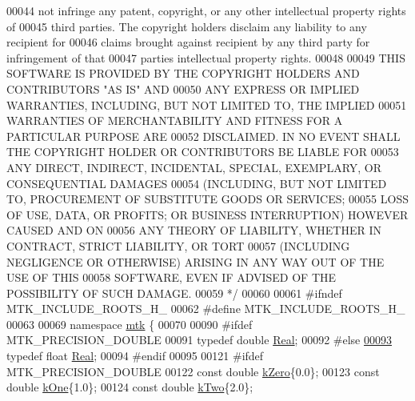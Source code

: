 \begin{DoxyCode}
00044 \textcolor{comment}{not infringe any patent, copyright, or any other intellectual property rights of}
00045 \textcolor{comment}{third parties. The copyright holders disclaim any liability to any recipient for}
00046 \textcolor{comment}{claims brought against recipient by any third party for infringement of that}
00047 \textcolor{comment}{parties intellectual property rights.}
00048 \textcolor{comment}{}
00049 \textcolor{comment}{THIS SOFTWARE IS PROVIDED BY THE COPYRIGHT HOLDERS AND CONTRIBUTORS "AS IS" AND}
00050 \textcolor{comment}{ANY EXPRESS OR IMPLIED WARRANTIES, INCLUDING, BUT NOT LIMITED TO, THE IMPLIED}
00051 \textcolor{comment}{WARRANTIES OF MERCHANTABILITY AND FITNESS FOR A PARTICULAR PURPOSE ARE}
00052 \textcolor{comment}{DISCLAIMED. IN NO EVENT SHALL THE COPYRIGHT HOLDER OR CONTRIBUTORS BE LIABLE FOR}
00053 \textcolor{comment}{ANY DIRECT, INDIRECT, INCIDENTAL, SPECIAL, EXEMPLARY, OR CONSEQUENTIAL DAMAGES}
00054 \textcolor{comment}{(INCLUDING, BUT NOT LIMITED TO, PROCUREMENT OF SUBSTITUTE GOODS OR SERVICES;}
00055 \textcolor{comment}{LOSS OF USE, DATA, OR PROFITS; OR BUSINESS INTERRUPTION) HOWEVER CAUSED AND ON}
00056 \textcolor{comment}{ANY THEORY OF LIABILITY, WHETHER IN CONTRACT, STRICT LIABILITY, OR TORT}
00057 \textcolor{comment}{(INCLUDING NEGLIGENCE OR OTHERWISE) ARISING IN ANY WAY OUT OF THE USE OF THIS}
00058 \textcolor{comment}{SOFTWARE, EVEN IF ADVISED OF THE POSSIBILITY OF SUCH DAMAGE.}
00059 \textcolor{comment}{*/}
00060 
00061 \textcolor{preprocessor}{#ifndef MTK\_INCLUDE\_ROOTS\_H\_}
00062 \textcolor{preprocessor}{#define MTK\_INCLUDE\_ROOTS\_H\_}
00063 
00069 \textcolor{keyword}{namespace }\hyperlink{namespacemtk}{mtk} \{
00070 
00090 \textcolor{preprocessor}{#ifdef MTK\_PRECISION\_DOUBLE}
00091 \textcolor{keyword}{typedef} \textcolor{keywordtype}{double} \hyperlink{group__c01-roots_gac080bbbf5cbb5502c9f00405f894857d}{Real};
00092 \textcolor{preprocessor}{#else}
\hypertarget{mtk__roots_8h_source_l00093}{}\hyperlink{group__c01-roots_gac080bbbf5cbb5502c9f00405f894857d}{00093} \textcolor{keyword}{typedef} \textcolor{keywordtype}{float} \hyperlink{group__c01-roots_gac080bbbf5cbb5502c9f00405f894857d}{Real};
00094 \textcolor{preprocessor}{#endif}
00095 
00121 \textcolor{preprocessor}{#ifdef MTK\_PRECISION\_DOUBLE}
00122 \textcolor{keyword}{const} \textcolor{keywordtype}{double} \hyperlink{group__c01-roots_ga59a451a5fae30d59649bcda274fea271}{kZero}\{0.0\};
00123 \textcolor{keyword}{const} \textcolor{keywordtype}{double} \hyperlink{group__c01-roots_ga26407c24d43b6b95480943340d285c71}{kOne}\{1.0\};
00124 \textcolor{keyword}{const} \textcolor{keywordtype}{double} \hyperlink{group__c01-roots_gaf39c2d851a2db744f4feb1c5ab3ec2cf}{kTwo}\{2.0\};

\end{DoxyCode}
